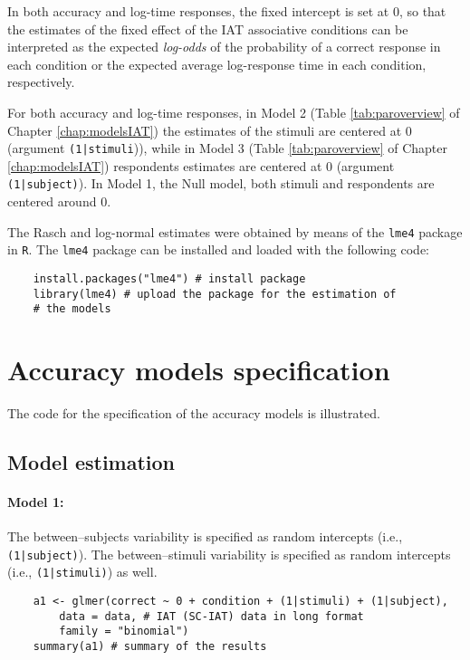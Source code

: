 \documentclass[12pt]{book}
\begin{document}
In both accuracy and log-time responses, the fixed intercept is set at 0, so that the estimates of the fixed effect of the IAT associative conditions can be interpreted as the expected \emph{log-odds} of the probability of a correct response in each condition or the expected average log-response time in each condition, respectively.

For both accuracy and log-time responses, in Model 2 (Table \ref{tab:paroverview} of Chapter \ref{chap:modelsIAT}) the estimates of the stimuli are centered at 0 (argument \texttt{(1|stimuli})), while in Model 3 (Table \ref{tab:paroverview} of Chapter \ref{chap:modelsIAT}) respondents estimates are centered at 0 (argument \texttt{(1|subject)}). 
In Model 1, the Null model, both stimuli and respondents are centered around 0. 

The Rasch and log-normal estimates were obtained by means of the \texttt{lme4} package \cite{lme4}  in \texttt{R}. 
The \texttt{lme4} package can be installed and loaded with the following code: 
%
\begin{lstlisting}
	install.packages("lme4") # install package
	library(lme4) # upload the package for the estimation of 
	# the models
\end{lstlisting}


\section{Accuracy models specification}


The code for the specification of the accuracy models is illustrated. 

\subsection{Model estimation}

\paragraph*{Model 1:} 

The between--subjects variability is specified as random intercepts (i.e., \texttt{(1|subject)}). 
The between--stimuli variability is specified as random intercepts (i.e., \texttt{(1|stimuli)}) as well.
%
\begin{lstlisting}
	a1 <- glmer(correct ~ 0 + condition + (1|stimuli) + (1|subject), 
		data = data, # IAT (SC-IAT) data in long format
		family = "binomial")
	summary(a1) # summary of the results  
\end{lstlisting}
\end{document}
